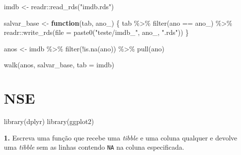 \documentclass[
]{book}
\newenvironment{Shaded}{\begin{snugshade}}{\end{snugshade}}
\newcommand{\AttributeTok}[1]{\textcolor[rgb]{0.77,0.63,0.00}{#1}}
\newcommand{\ControlFlowTok}[1]{\textcolor[rgb]{0.13,0.29,0.53}{\textbf{#1}}}
\newcommand{\FunctionTok}[1]{\textcolor[rgb]{0.00,0.00,0.00}{#1}}
\newcommand{\NormalTok}[1]{#1}
\newcommand{\OtherTok}[1]{\textcolor[rgb]{0.56,0.35,0.01}{#1}}
\newcommand{\SpecialCharTok}[1]{\textcolor[rgb]{0.00,0.00,0.00}{#1}}
\newcommand{\StringTok}[1]{\textcolor[rgb]{0.31,0.60,0.02}{#1}}
\begin{document}
\begin{Shaded}
\begin{Highlighting}[]
\NormalTok{imdb }\OtherTok{\textless{}{-}}\NormalTok{ readr}\SpecialCharTok{::}\FunctionTok{read\_rds}\NormalTok{(}\StringTok{"imdb.rds"}\NormalTok{)}

\NormalTok{salvar\_base }\OtherTok{\textless{}{-}} \ControlFlowTok{function}\NormalTok{(tab, ano\_) \{}
\NormalTok{  tab }\SpecialCharTok{\%\textgreater{}\%} 
    \FunctionTok{filter}\NormalTok{(ano }\SpecialCharTok{==}\NormalTok{ ano\_) }\SpecialCharTok{\%\textgreater{}\%} 
\NormalTok{    readr}\SpecialCharTok{::}\FunctionTok{write\_rds}\NormalTok{(}\AttributeTok{file =} \FunctionTok{paste0}\NormalTok{(}\StringTok{"teste/imdb\_"}\NormalTok{, ano\_, }\StringTok{".rds"}\NormalTok{))}
\NormalTok{\}}

\NormalTok{anos }\OtherTok{\textless{}{-}}\NormalTok{ imdb }\SpecialCharTok{\%\textgreater{}\%} 
  \FunctionTok{filter}\NormalTok{(}\SpecialCharTok{!}\FunctionTok{is.na}\NormalTok{(ano)) }\SpecialCharTok{\%\textgreater{}\%} 
  \FunctionTok{pull}\NormalTok{(ano)}

\FunctionTok{walk}\NormalTok{(anos, salvar\_base, }\AttributeTok{tab =}\NormalTok{ imdb)}
\end{Highlighting}
\end{Shaded}

\hypertarget{nse-1}{%
\section{NSE}\label{nse-1}}

\begin{Shaded}
\begin{Highlighting}[]
\FunctionTok{library}\NormalTok{(dplyr)}
\FunctionTok{library}\NormalTok{(ggplot2)}
\end{Highlighting}
\end{Shaded}

\textbf{1.} Escreva uma função que recebe uma \emph{tibble} e uma coluna qualquer e devolve uma \emph{tibble} sem as linhas contendo \texttt{NA} na coluna especificada.
\end{document}
